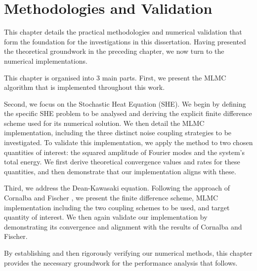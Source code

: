\chapter{Methodologies and Validation}\label{chap:method_and_validation}

This chapter details the practical methodologies and numerical validation 
that form the foundation for the investigations in this dissertation. Having 
presented the theoretical groundwork in the preceding chapter, we now 
turn to the numerical implementations.

This chapter is organised into 3 main parts. First, 
we present the MLMC algorithm that is implemented throughout this work.


Second, we focus on the Stochastic Heat Equation (SHE). We begin
by defining the specific SHE problem to be analysed and 
deriving the explicit finite difference scheme 
used for its numerical solution. We then 
detail the MLMC implementation,
including the three distinct noise coupling strategies to be investigated. 
To validate this implementation, we apply the method to two  
chosen quantities of interest: the squared amplitude of
Fourier modes and the system's total energy. We first derive 
theoretical convergence values and rates for these quantities, and then demonstrate that
our implementation aligns with these.

Third, we address the Dean-Kawasaki equation. Following 
the approach of Cornalba and Fischer \cite{cornalba2025multilevel}, 
we present the finite difference scheme, MLMC implementation including the two coupling 
schemes to be used, and target 
quantity of interest. 
We then again validate our implementation
by demonstrating its convergence and alignment with the results of Cornalba and Fischer.

By establishing and then rigorously verifying our numerical methods, this chapter 
provides the necessary groundwork for the performance analysis that follows.







